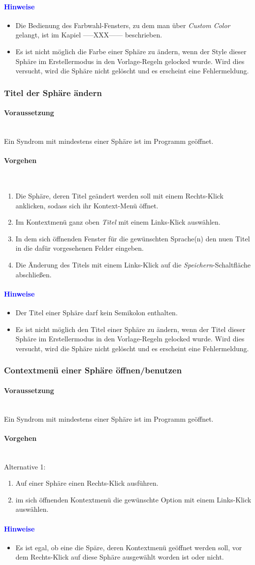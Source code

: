 \documentclass[enabledeprecatedfontcommands,fontsize=11pt,paper=a4,twoside]{scrartcl}
\newcommand*{\hint}{\paragraph{\textcolor{blue}{Hinweise}}}
\newcommand*{\condition}{\paragraph{Voraussetzung}$\;$ \vspace{0.2cm}\\}
\newcommand*{\actions}{\paragraph{Vorgehen} $\;$\vspace{0.2cm}\\}
\begin{document}
		\hint
		\begin{itemize}
			\item Die Bedienung des Farbwahl-Fensters, zu dem man über \textit{Custom Color} gelangt, ist im Kapiel -----XXX------ beschrieben.
			\item Es ist nicht möglich die Farbe einer Sphäre zu ändern, wenn der Style dieser Sphäre im Erstellermodus in den Vorlage-Regeln gelocked wurde. Wird dies versucht, wird die Sphäre nicht gelöscht und es erscheint eine Fehlermeldung.
	\end{itemize}	
	\subsubsection{Titel der Sphäre ändern}
				\condition 	
		Ein Syndrom mit mindestens einer Sphäre ist im Programm geöffnet. 
		\actions  
		\begin{enumerate}
			\item Die Sphäre, deren Titel geändert werden soll mit einem Rechts-Klick anklicken, sodass sich ihr Kontext-Menü öffnet.
			\item Im Kontextmenü ganz oben \textit{Titel} mit einem Links-Klick auswählen. 
			\item In dem sich öffnenden Fenster für die gewünschten Sprache(n) den nuen Titel in die dafür vorgesehenen Felder eingeben.
			\item Die Änderung des Titels mit einem Links-Klick auf die \textit{Speichern}-Schaltfläche abschließen.
		\end{enumerate}
		\hint
		\begin{itemize}
			\item Der Titel einer Sphäre darf kein Semikolon enthalten.
			\item 
Es ist nicht möglich den Titel einer Sphäre zu ändern, wenn der Titel dieser Sphäre im Erstellermodus in den Vorlage-Regeln gelocked wurde. Wird dies versucht, wird die Sphäre nicht gelöscht und es erscheint eine Fehlermeldung.
		\end{itemize}
		\subsubsection{Contextmenü einer Sphäre öffnen/benutzen}
				\condition 	
		Ein Syndrom mit mindestens einer Sphäre ist im Programm geöffnet. 
		\actions  
		Alternative 1:
		\begin{enumerate}
			\item Auf einer Sphäre einen Rechts-Klick ausführen.
			\item im sich öffnenden Kontextmenü die gewünschte Option mit einem Links-Klick auswählen.
		\end{enumerate}
		\hint
		\begin{itemize}
			\item Es ist egal, ob eine die Späre, deren Kontextmenü geöffnet werden soll, vor dem Rechts-Klick auf diese Sphäre ausgewählt worden ist oder nicht.
		\end{itemize}
\end{document}
